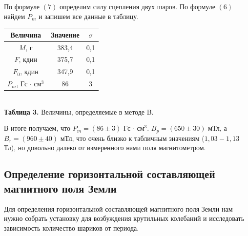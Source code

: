 \documentclass[a4paper, 12pt]{article}%
\begin{document}
По формуле $(7)$ определим силу сцепления двух шаров. По формуле $(6)$ найдем $P_m$ и запишем все данные в таблицу.
\begin{center}
\begin{tabular}{|c|c|c|}
\hline
Величина & Значение & $\sigma$ \\ \hline
$M$, г & 383,4 & 0,1 \\ \hline
$F$, кдин & 375,7 & 0,1 \\ \hline
$F_0$, кдин & 347,9 & 0,1 \\ \hline
$P_m$, Гс $\cdot$ см$^3$ & 86 & 3 \\ \hline
\end{tabular}\\
\textbf{Таблица 3.} Величины, определяемые в методе B.
\end{center}
В итоге получаем, что $P_m = (86 \pm 3)$ Гс $\cdot$ см$^3$. $B_p = (650 \pm 30)$ мТл, а $B_r = (960 \pm 40)$ мТл, что очень близко к табличным значениям ($1,03 - 1,13$ Тл), но довольно далеко от измеренного нами поля магнитометром.
\subsection*{Определение горизонтальной составляющей магнитного поля Земли}
Для определения горизонтальной составляющей магнитного поля Земли нам нужно собрать установку для возбуждения крутильных колебаний и исследовать зависимость количество шариков от периода. 
\end{document}
